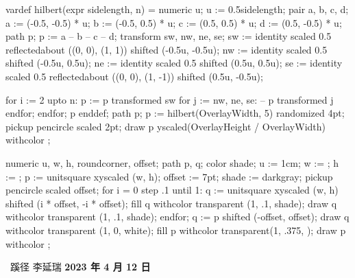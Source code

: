 \setupinteraction[
  title={ConTeXt 蹊径},
  author={李延瑞 (lyr.m2@live.cn)},
  keyword={TeX, ConTeXt MkIV, ConTeXt LMTX, LuaTeX, LuaMetaTeX}
]
\startMPinclusions
vardef hilbert(expr sidelength, n) = 
  numeric u; u := 0.5sidelength;
  pair a, b, c, d;
  a := (-0.5, -0.5) * u;
  b := (-0.5, 0.5) * u;
  c := (0.5, 0.5) * u;
  d := (0.5, -0.5) * u;
  path p; 
  p := a -- b -- c -- d;
  transform sw, nw, ne, se;
  sw := identity
        scaled 0.5
        reflectedabout ((0, 0), (1, 1))
        shifted (-0.5u, -0.5u);
  nw := identity
        scaled 0.5
        shifted (-0.5u, 0.5u);
  ne := identity
        scaled 0.5
        shifted (0.5u, 0.5u);
  se := identity
        scaled 0.5
        reflectedabout ((0, 0), (1, -1))
        shifted (0.5u, -0.5u);

  for i := 2 upto n:
    p := p transformed sw for j := nw, ne, se: -- p transformed j endfor;
  endfor;
  p
enddef;
\stopMPinclusions
{}
path p; p := hilbert(OverlayWidth, 5) randomized 4pt;
pickup pencircle scaled 2pt;
draw p yscaled(OverlayHeight / OverlayWidth) withcolor ; %
\stopuseMPgraphic
{}

numeric u, w, h, roundcorner, offset;
path p, q;
color shade;
u := 1cm; w := \overlaywidth; h := \overlayheight;
p := unitsquare xyscaled (w, h);
offset := 7pt;
shade := darkgray;
pickup pencircle scaled offset;
for i = 0 step .1 until 1:
    q := unitsquare xyscaled (w, h) shifted (i * offset, -i * offset);
    fill q withcolor transparent (1, .1, shade);
    draw q withcolor transparent (1, .1, shade);
endfor;
q := p shifted (-offset, offset);
draw q withcolor transparent (1, 0, white);
fill p withcolor transparent(1, .375, );
draw p withcolor ;
\stopuniqueMPgraphic
{}

\setupbackgrounds[page][background=TitleGraphic]
\startstandardmakeup
  \startcolor[lightgreen]
    \startcoverbox[middle][width=.6\textwidth,height=5cm,toffset=.8cm]
      \strut
      \hfil \bfd\ConTeXt\ 蹊径\hfil
      \blank[1cm]
      \hfil\bfa 李延瑞\hfil
      \blank[.25cm]
      \hfil\bf 2023 年 4 月 12 日\hfil
    \stopcoverbox
  \stopcolor
  \blank[14cm]
\stopstandardmakeup
\setupbackgrounds[page][background=]
